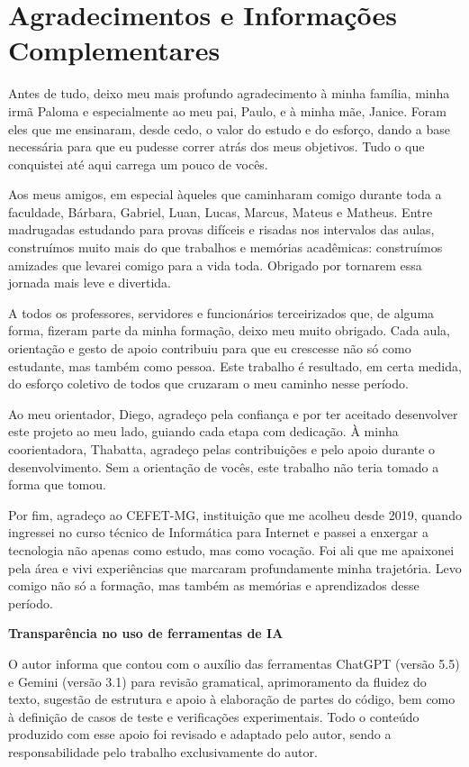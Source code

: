 \chapter*{Agradecimentos e Informações Complementares} \thispagestyle{empty}

Antes de tudo, deixo meu mais profundo agradecimento à minha família, minha irmã Paloma e especialmente ao meu pai, Paulo, e à minha mãe, Janice. Foram eles que me ensinaram, desde cedo, o valor do estudo e do esforço, dando a base necessária para que eu pudesse correr atrás dos meus objetivos. Tudo o que conquistei até aqui carrega um pouco de vocês.

Aos meus amigos, em especial àqueles que caminharam comigo durante toda a faculdade, Bárbara, Gabriel, Luan, Lucas, Marcus, Mateus e Matheus. Entre madrugadas estudando para provas difíceis e risadas nos intervalos das aulas, construímos muito mais do que trabalhos e memórias acadêmicas: construímos amizades que levarei comigo para a vida toda. Obrigado por tornarem essa jornada mais leve e divertida.

A todos os professores, servidores e funcionários terceirizados que, de alguma forma, fizeram parte da minha formação, deixo meu muito obrigado. Cada aula, orientação e gesto de apoio contribuiu para que eu crescesse não só como estudante, mas também como pessoa. Este trabalho é resultado, em certa medida, do esforço coletivo de todos que cruzaram o meu caminho nesse período.

Ao meu orientador, Diego, agradeço pela confiança e por ter aceitado desenvolver este projeto ao meu lado, guiando cada etapa com dedicação. À minha coorientadora, Thabatta, agradeço pelas contribuições e pelo apoio durante o desenvolvimento. Sem a orientação de vocês, este trabalho não teria tomado a forma que tomou.

Por fim, agradeço ao CEFET-MG, instituição que me acolheu desde 2019, quando ingressei no curso técnico de Informática para Internet e passei a enxergar a tecnologia não apenas como estudo, mas como vocação. Foi ali que me apaixonei pela área e vivi experiências que marcaram profundamente minha trajetória. Levo comigo não só a formação, mas também as memórias e aprendizados desse período.


\vspace{0.5cm}
\noindent\textbf{Transparência no uso de ferramentas de IA}

O autor informa que contou com o auxílio das ferramentas ChatGPT (versão 5.5) e Gemini (versão 3.1) para revisão gramatical, aprimoramento da fluidez do texto, sugestão de estrutura e apoio à elaboração de partes do código, bem como à definição de casos de teste e verificações experimentais. Todo o conteúdo produzido com esse apoio foi revisado e adaptado pelo autor, sendo a responsabilidade pelo trabalho exclusivamente do autor.
